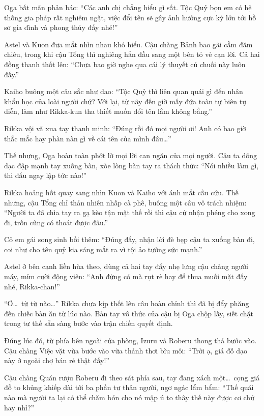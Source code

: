 \documentclass[../main.tex]{subfiles}
\begin{document}
Oga bất mãn phản bác: ``Các anh chị chẳng hiểu gì sất. Tộc Quỷ bọn em có hệ thống gia pháp rất nghiêm ngặt, việc đổi tên sẽ gây ảnh hưởng cực kỳ lớn tới hồ sơ gia đình và phong thủy đấy nhé!''

Astel và Kuon đưa mắt nhìn nhau khó hiểu. Cậu chàng Bảnh bao gãi cằm đăm chiêu, trong khi cậu Tổng thì nghiêng hẳn đầu sang một bên tỏ vẻ cạn lời. Cả hai đồng thanh thốt lên: ``Chưa bao giờ nghe qua cái lý thuyết củ chuối này luôn đấy.''

Kaiho buông một câu sắc như dao: ``Tộc Quỷ thì liên quan quái gì đến nhân khẩu học của loài người chứ? Với lại, từ nãy đến giờ mấy đứa toàn tự biên tự diễn, làm như Rikka-kun tha thiết muốn đổi tên lắm không bằng.''

Rikka vội vã xua tay thanh minh: ``Đúng rồi đó mọi người ơi! Anh có bao giờ thắc mắc hay phàn nàn gì về cái tên của mình đâu\dots''

Thế nhưng, Oga hoàn toàn phớt lờ mọi lời can ngăn của mọi người. Cậu ta dõng dạc đập mạnh tay xuống bàn, xòe lòng bàn tay ra thách thức: ``Nói nhiều làm gì, thi đấu ngay lập tức nào!''

Rikka hoảng hốt quay sang nhìn Kuon và Kaiho với ánh mắt cầu cứu. Thế nhưng, cậu Tổng chỉ thản nhiên nhấp cà phê, buông một câu vô trách nhiệm: ``Người ta đã chìa tay ra gạ kèo tận mặt thế rồi thì cậu cứ nhận phéng cho xong đi, trốn cũng có thoát được đâu.''

Cô em gái song sinh bồi thêm: ``Đúng đấy, nhận lời đè bẹp cậu ta xuống bàn đi, coi như cho tên quỷ kia sáng mắt ra vì tội ảo tưởng sức mạnh.''

Astel ở bên cạnh liền hùa theo, dùng cả hai tay đẩy nhẹ lưng cậu chàng người máy, mỉm cười động viên: ``Anh đừng có mà rụt rè hay để thua muối mặt đấy nhé, Rikka-chan!''


``Ơ\dots\ từ từ nào\dots'' Rikka chưa kịp thốt lên câu hoàn chỉnh thì đã bị đẩy phăng đến chiếc bàn ăn từ lúc nào. Bàn tay vô thức của cậu bị Oga chộp lấy, siết chặt trong tư thế sẵn sàng bước vào trận chiến quyết định.

Đúng lúc đó, từ phía bên ngoài cửa phòng, Izuru và Roberu thong thả bước vào. Cậu chàng Việc vặt vừa bước vào vừa thảnh thơi bĩu môi: ``Trời ạ, giá đỗ dạo này ở ngoài chợ bán rẻ thật đấy!''

Cậu chàng Quán rượu Roberu đi theo sát phía sau, tay đang xách một\dots\ cọng giá đỗ to khủng khiếp dài tới ba phần tư thân người, ngơ ngác lẩm bẩm: ``Thế quái nào mà người ta lại có thể chăm bón cho nó mập ú to thây thế này được cơ chứ hay nhỉ?''
\end{document}
